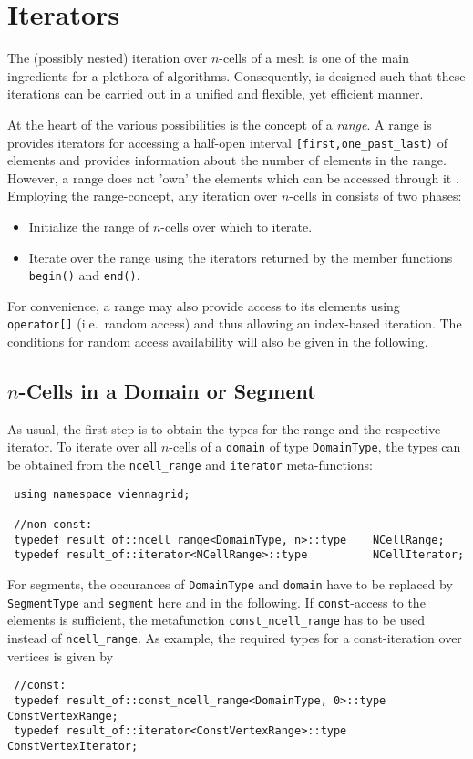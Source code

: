 \chapter{Iterators} \label{chap:iterators}
The (possibly nested) iteration over $n$-cells of a mesh is one of the main ingredients for a plethora of algorithms.
Consequently, {\ViennaGrid} is designed such that these iterations can be carried out in a unified and flexible, yet efficient manner.

At the heart of the various possibilities is the concept of a \emph{range}. A range is provides iterators for accessing a half-open interval \texttt{[first,one\_past\_last)} of elements and provides information about the number of elements in the range. However, a range does not 'own' the elements which can be accessed through it \cite{boost}. 
Employing the range-concept, any iteration over $n$-cells in {\ViennaGrid} consists of two phases:
\begin{itemize}
 \item Initialize the range of $n$-cells over which to iterate.
 \item Iterate over the range using the iterators returned by the member functions \lstinline|begin()| and \lstinline|end()|.
\end{itemize}

For convenience, a range may also provide access to its elements using \lstinline|operator[]| (i.e.~random access) and thus allowing an index-based iteration. The conditions for random access availability will also be given in the following.


\section{$n$-Cells in a Domain or Segment}
As usual, the first step is to obtain the types for the range and the respective iterator.
To iterate over all $n$-cells of a \lstinline|domain| of type \lstinline|DomainType|, the types can be obtained from the \lstinline|ncell_range| and \lstinline|iterator| meta-functions:
\begin{lstlisting}
 using namespace viennagrid;

 //non-const:
 typedef result_of::ncell_range<DomainType, n>::type    NCellRange;
 typedef result_of::iterator<NCellRange>::type          NCellIterator;
\end{lstlisting}
For segments, the occurances of \lstinline|DomainType| and \lstinline|domain| have to be replaced by \lstinline|SegmentType| and \lstinline|segment| here and in the following.
If \lstinline|const|-access to the elements is sufficient, the metafunction \lstinline|const_ncell_range| has to be used instead of \lstinline|ncell_range|.
As example, the required types for a const-iteration over vertices is given by
\begin{lstlisting}
 //const:
 typedef result_of::const_ncell_range<DomainType, 0>::type   ConstVertexRange;
 typedef result_of::iterator<ConstVertexRange>::type         ConstVertexIterator;
\end{lstlisting}

